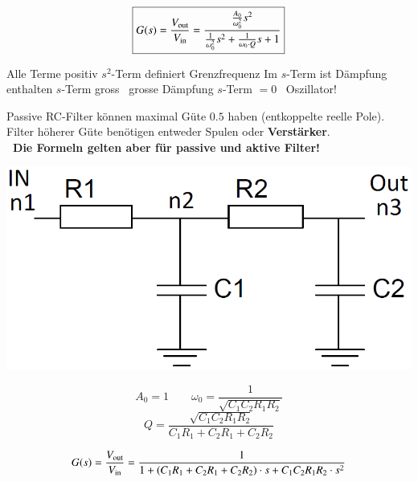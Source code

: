 \vspace{0.2cm}

\begin{minipage}[t]{0.48\columnwidth}
    \begin{center}
    \end{center}
    $$ \boxed{ G(s) = \frac{V_{\rm out}}{V_{\rm in}} = \frac{\frac{A_0}{\omega_0^2} s^2}{\frac{1}{\omega_0^2} s^2 + \frac{1}{\omega_0 \cdot Q} s + 1 } } $$
\end{minipage}
\hfill
\begin{minipage}[t]{0.48\columnwidth}
    \begin{center}
    \end{center}
    \begin{outline}
        \1 Alle Terme positiv
        \1 $s^2$-Term definiert Grenzfrequenz
        \1 Im $s$-Term ist Dämpfung enthalten
            \2 $s$-Term gross \textrightarrow\ grosse Dämpfung
            \2 $s$-Term $= 0$ \textrightarrow\ Oszillator!
    \end{outline}
\end{minipage}

\vspace{0.2cm}

Passive RC-Filter können maximal Güte $0.5$ haben (entkoppelte reelle Pole). Filter höherer Güte benötigen entweder
Spulen oder \textbf{Verstärker}. \\
\textbf{\textrightarrow\ Die Formeln gelten aber für passive und aktive Filter!}




\begin{minipage}[c]{0.4\columnwidth}
    \includegraphics[width=\columnwidth]{images/tiefpass_ordnung_2.png}
\end{minipage}
\hfill
\begin{minipage}[c]{0.58\columnwidth}
    $$ A_0 = 1 \qquad \omega_0 = \frac{1}{\sqrt{C_1 C_2 R_1 R_2}} $$
    $$ Q = \frac{\sqrt{C_1 C_2 R_1 R_2}}{C_1 R_1 + C_2 R_1 + C_2 R_2} $$
\end{minipage}
$$ G(s) = \frac{V_{\rm out}}{V_{\rm in}} = \frac{1}{1 + (C_1 R_1 + C_2 R_1 + C_2 R_2) \cdot s + C_1 C_2 R_1 R_2 \cdot s^2 } $$


